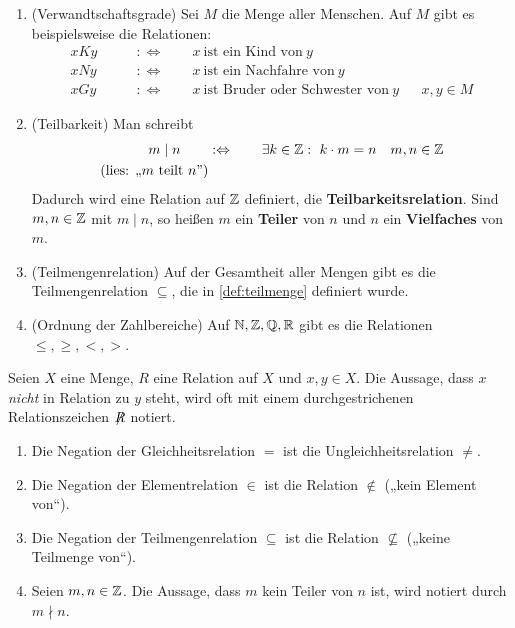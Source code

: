 \begin{bsp} \label{bsp:relation}   \quad
    \begin{enumerate}
        \item(Verwandtschaftsgrade) Sei $M$ die Menge aller Menschen. Auf $M$ gibt es beispielsweise die Relationen:
        \begin{align*}
            xKy \qquad&:\Leftrightarrow\qquad x\ \text{ist ein Kind von}\ y && \\
            xNy \qquad&:\Leftrightarrow\qquad x\ \text{ist ein Nachfahre von}\ y && \\
            xGy \qquad&:\Leftrightarrow\qquad x\ \text{ist Bruder oder Schwester von}\ y && x,y\in M
        \end{align*}
        \item(Teilbarkeit) Man schreibt
        \begin{align*}
            m \mid n \qquad& :\Leftrightarrow\qquad \exists k\in \mathbb Z:\ k\cdot m=n && m,n\in \mathbb Z \\
            (\text{lies: „$m$ teilt $n$”})
        \end{align*}
        Dadurch wird eine Relation auf $\mathbb Z$ definiert, die \textbf{Teilbarkeitsrelation}. Sind $m,n\in \mathbb Z$ mit $m\mid n$, so heißen $m$ ein \textbf{Teiler} von $n$ und $n$ ein \textbf{Vielfaches} von $m$.
        \item(Teilmengenrelation) Auf der Gesamtheit aller Mengen gibt es die Teilmengenrelation $\subseteq$, die in \cref{def:teilmenge} definiert wurde.
        \item(Ordnung der Zahlbereiche) Auf $\mathbb N,\mathbb Z,\mathbb Q,\mathbb R$ gibt es die Relationen $\le, \ge, <, >$.
    \end{enumerate}
\end{bsp}


\begin{nota}
    Seien $X$ eine Menge, $R$ eine Relation auf $X$ und $x,y\in X$. Die Aussage, dass $x$ \emph{nicht} in Relation zu $y$ steht, wird oft mit einem durchgestrichenen Relationszeichen $\not\mathrel{R}$ notiert.
\end{nota}


\begin{bsp} \quad
    \begin{enumerate}
        \item Die Negation der Gleichheitsrelation $=$ ist die Ungleichheitsrelation $\neq$.
        \item Die Negation der Elementrelation $\in$ ist die Relation $\notin$ („kein Element von“).
        \item Die Negation der Teilmengenrelation $\subseteq$ ist die Relation $\nsubseteq$ („keine Teilmenge von“).
        \item Seien $m,n\in \mathbb Z$. Die Aussage, dass $m$ kein Teiler von $n$ ist, wird notiert durch $m\nmid n$.
    \end{enumerate}
\end{bsp}


